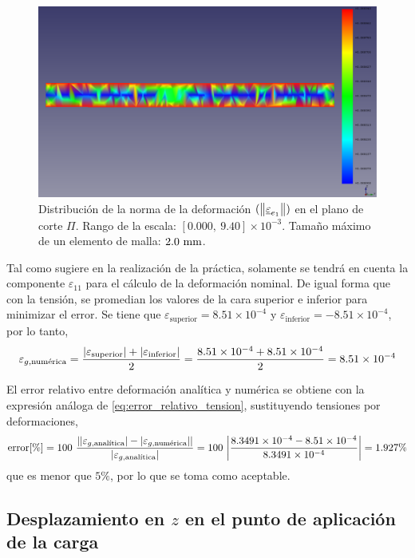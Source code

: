 \begin{figure}[H]
    \centering
    \includegraphics[width=\textwidth]{figures/resultados/strain_vector_magnitude_20.pdf}
    \caption{Distribución de la norma de la deformación $(\norm{\vec{\varepsilon}_{e_1}})$ en el plano de corte $\Pi$. Rango de la escala: $[0.000, \ 9.40] \times 10^{-3}$. Tamaño máximo de un elemento de malla: $2.0 \ \milli\meter$.}
    \label{fig:strain_vector_magnitude_20}
\end{figure}

Tal como sugiere \cite{manualPractica1} en la realización de la práctica, solamente se tendrá en cuenta la componente $\varepsilon_{11}$ para el cálculo de la deformación nominal. De igual forma que con la tensión, se promedian los valores de la cara superior e inferior para minimizar el error. Se tiene que $\varepsilon_\text{superior} = 8.51 \times 10^{-4}$ y $\varepsilon_\text{inferior} = -8.51 \times 10^{-4}$, por lo tanto,
\[
    \varepsilon_{g,\text{numérica}} = 
    \frac{\abs{\varepsilon_\text{superior}} + \abs{\varepsilon_\text{inferior}}}{2} = 
    \frac{8.51 \times 10^{-4} + 8.51 \times 10^{-4}}{2} = 
    8.51 \times 10^{-4}
\]

El error relativo entre deformación analítica y numérica se obtiene con la expresión análoga de \eqref{eq:error_relativo_tension}, sustituyendo tensiones por deformaciones,
\[
    \text{error}[\%] = 
    100 \ 
    \frac{
    \abs{\abs{\varepsilon_{g,\text{analítica}}} - \abs{\varepsilon_{g,\text{numérica}}}}}{\abs{\varepsilon_{g,\text{analítica}}}} = 
    100 \ \abs{\frac{8.3491 \times 10^{-4} - 8.51 \times 10^{-4}}{8.3491 \times 10^{-4}}} = 
    1.927 \%
\]
que es menor que $5 \%$, por lo que se toma como aceptable.


\subsection{Desplazamiento en \texorpdfstring{$z$}{z} en el punto de aplicación de la carga}

